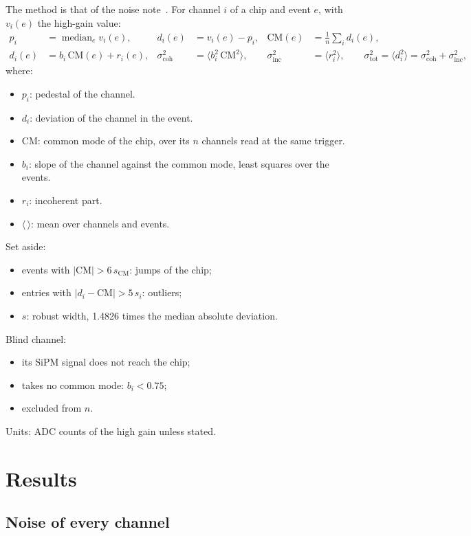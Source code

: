 \documentclass[11pt,a4paper]{article}
\begin{document}
The method is that of the noise note~\cite{noisenote}. For channel $i$ of a chip and event $e$,
with $v_i(e)$ the high-gain value:
\begin{align*}
p_i &= \operatorname{median}_e v_i(e), & d_i(e) &= v_i(e) - p_i, &
\mathrm{CM}(e) &= \frac{1}{n}\sum_{i} d_i(e),\\
d_i(e) &= b_i\,\mathrm{CM}(e) + r_i(e), &
\sigma_\mathrm{coh}^2 &= \langle b_i^2\,\mathrm{CM}^2\rangle, &
\sigma_\mathrm{inc}^2 &= \langle r_i^2\rangle, \qquad
\sigma_\mathrm{tot}^2 = \langle d_i^2\rangle = \sigma_\mathrm{coh}^2 + \sigma_\mathrm{inc}^2,
\end{align*}
where:
\begin{itemize}
\item $p_i$: pedestal of the channel.
\item $d_i$: deviation of the channel in the event.
\item $\mathrm{CM}$: common mode of the chip, over its $n$ channels read at the same trigger.
\item $b_i$: slope of the channel against the common mode, least squares over the events.
\item $r_i$: incoherent part.
\item $\langle\,\rangle$: mean over channels and events.
\end{itemize}
Set aside:
\begin{itemize}
\item events with $|\mathrm{CM}| > 6\,s_\mathrm{CM}$: jumps of the chip;
\item entries with $|d_i - \mathrm{CM}| > 5\,s_i$: outliers;
\item $s$: robust width, 1.4826 times the median absolute deviation.
\end{itemize}
Blind channel:
\begin{itemize}
\item its SiPM signal does not reach the chip;
\item takes no common mode: $b_i < 0.75$;
\item excluded from $n$.
\end{itemize}
Units: ADC counts of the high gain unless stated.

\section{Results}

\subsection{Noise of every channel}
\end{document}

